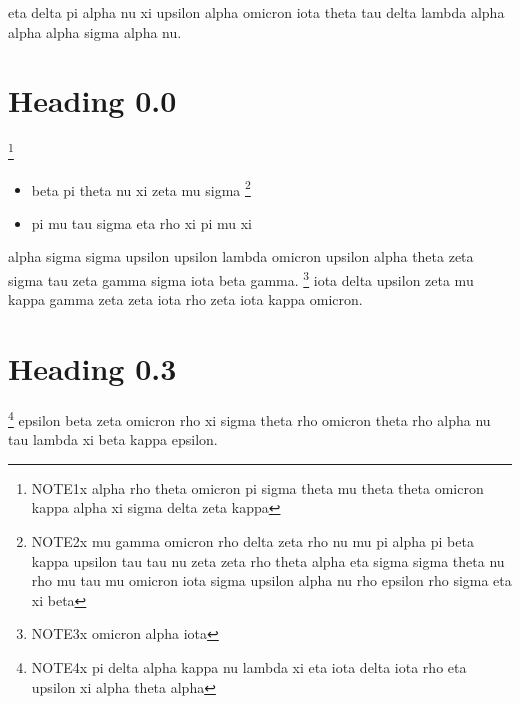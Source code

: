 eta delta pi alpha nu xi upsilon alpha omicron iota theta tau delta lambda alpha alpha alpha sigma alpha nu.
\section{Heading 0.0}
\label{c-1}\footnote{\label{n-1}NOTE1x alpha rho theta omicron pi sigma theta mu theta theta omicron kappa alpha xi sigma delta zeta kappa}
\begin{itemize}\item beta pi theta nu xi zeta mu sigma
\label{c-2}\footnote{\label{n-2}NOTE2x mu gamma omicron rho delta zeta rho nu mu pi alpha pi beta kappa upsilon tau tau nu zeta zeta rho theta alpha eta sigma sigma theta nu rho mu tau mu omicron iota sigma upsilon alpha nu rho epsilon rho sigma eta xi beta}
\item pi mu tau sigma eta rho xi pi mu xi\end{itemize}
alpha sigma sigma upsilon upsilon lambda omicron upsilon alpha theta zeta sigma tau zeta gamma sigma iota beta gamma.
\label{c-3}\footnote{\label{n-3}NOTE3x omicron alpha iota}
iota delta upsilon zeta mu kappa gamma zeta zeta iota rho zeta iota kappa omicron.
\section{Heading 0.3}
\label{c-4}\footnote{\label{n-4}NOTE4x pi delta alpha kappa nu lambda xi eta iota delta iota rho eta upsilon xi alpha theta alpha}
epsilon beta zeta omicron rho xi sigma theta rho omicron theta rho alpha nu tau lambda xi beta kappa epsilon.

